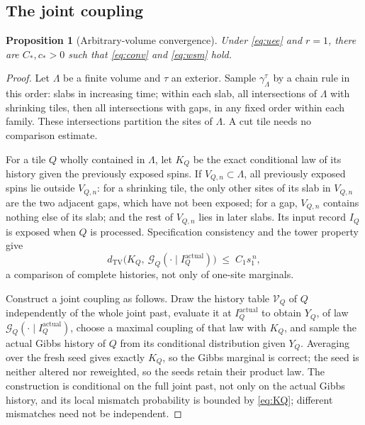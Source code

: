 \documentclass[11pt]{article}
\theoremstyle{plain}
\newtheorem{proposition}[theorem]{Proposition}
\theoremstyle{definition}
\theoremstyle{remark}
\newcommand{\dtv}{d_{\mathrm{TV}}}
\newcommand{\Lam}{\Lambda}
\begin{document}
\subsection{The joint coupling}

\begin{proposition}[Arbitrary-volume convergence]
\label{prop:wsm}
Under \eqref{eq:uee} and $r=1$, there are $C_*,c_*>0$ such that \eqref{eq:conv} and \eqref{eq:wsm} hold.
\end{proposition}

\begin{proof}
Let $\Lam$ be a finite volume and $\tau$ an exterior. Sample $\gamma^\tau_\Lam$ by a chain rule in this order: slabs in increasing time; within each slab, all intersections of $\Lam$ with shrinking tiles, then all intersections with gaps, in any fixed order within each family. These intersections partition the sites of $\Lam$. A cut tile needs no comparison estimate.

For a tile $Q$ wholly contained in $\Lam$, let $K_Q$ be the exact conditional law of its history given the previously exposed spins. If $V_{Q,n}\subset\Lam$, all previously exposed spins lie outside $V_{Q,n}$: for a shrinking tile, the only other sites of its slab in $V_{Q,n}$ are the two adjacent gaps, which have not been exposed; for a gap, $V_{Q,n}$ contains nothing else of its slab; and the rest of $V_{Q,n}$ lies in later slabs. Its input record $I_Q$ is exposed when $Q$ is processed. Specification consistency and the tower property give
\begin{equation}
\dtv\bigl(K_Q,\ \mathcal G_Q(\cdot\mid I^{\mathrm{actual}}_Q)\bigr)\;\le\;C_1s_1^{\,n},
\label{eq:KQ}
\end{equation}
a comparison of complete histories, not only of one-site marginals.

Construct a joint coupling as follows. Draw the history table $\mathcal V_Q$ of $Q$ independently of the whole joint past, evaluate it at $I^{\mathrm{actual}}_Q$ to obtain $Y_Q$, of law $\mathcal G_Q(\cdot\mid I^{\mathrm{actual}}_Q)$, choose a maximal coupling of that law with $K_Q$, and sample the actual Gibbs history of $Q$ from its conditional distribution given $Y_Q$. Averaging over the fresh seed gives exactly $K_Q$, so the Gibbs marginal is correct; the seed is neither altered nor reweighted, so the seeds retain their product law. The construction is conditional on the full joint past, not only on the actual Gibbs history, and its local mismatch probability is bounded by \eqref{eq:KQ}; different mismatches need not be independent.


\end{proof}
\end{document}
